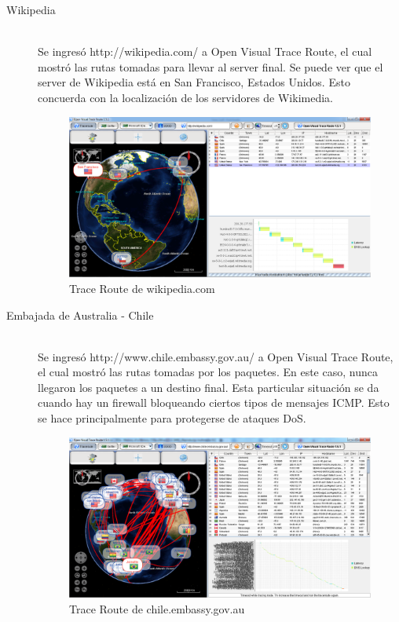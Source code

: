 \documentclass{article}
\begin{document}
\begin{description}
\item[Wikipedia] \hfill \\
Se ingresó http://wikipedia.com/ a Open Visual Trace Route, el cual mostró las rutas tomadas para llevar al server final. Se puede ver que el server de Wikipedia está en San Francisco, Estados Unidos. Esto concuerda con la localización de los servidores de Wikimedia\citep{website:wikimedia}.

\begin{figure}[H]
\centering
\includegraphics[width=\textwidth]{tracerouteWikipedia.png}
\caption{Trace Route de wikipedia.com}
\label{fig:wikipedia}
\end{figure}    
  
\item[Embajada de Australia - Chile] \hfill \\
Se ingresó http://www.chile.embassy.gov.au/ a Open Visual Trace Route, el cual mostró las rutas tomadas por los paquetes. En este caso, nunca llegaron los paquetes a un destino final. Esta particular situación se da cuando hay un firewall bloqueando ciertos tipos de mensajes ICMP. Esto se hace principalmente para protegerse de ataques DoS.

\begin{figure}[H]
\centering
\includegraphics[width=\textwidth]{traceroute_australia.png}
\caption{Trace Route de chile.embassy.gov.au}
\label{fig:embajadaChilena}
\end{figure}  

\end{description}
\end{document}

